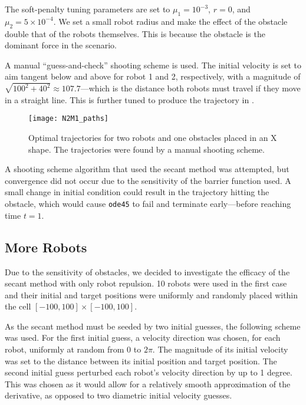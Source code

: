 \documentclass[11pt]{article}
\begin{document}
The soft-penalty tuning parameters are set to \(\mu_1 = 10^{-3}\), \(r = 0\), and \(\mu_2 = 5 \times 10^{-4}\). We set a small robot radius and make the effect of the obstacle double that of the robots themselves. This is because the obstacle is the dominant force in the scenario.

A manual ``guess-and-check'' shooting scheme is used. The initial velocity is set to aim tangent below and above for robot 1 and 2, respectively, with a magnitude of \(\sqrt{100^2 + 40^2} \approx 107.7\)---which is the distance both robots must travel if they move in a straight line. This is further tuned to produce the trajectory in .

\begin{figure}
	\centering
	\texttt{[image: N2M1\_paths]}
	\caption{Optimal trajectories for two robots and one obstacles placed in an X shape. The trajectories were found by a manual shooting scheme.}
	\label{fig:n2m1-paths}
\end{figure}

A shooting scheme algorithm that used the secant method was attempted, but convergence did not occur due to the sensitivity of the barrier function used. A small change in initial condition could result in the trajectory hitting the obstacle, which would cause \texttt{ode45} to fail and terminate early---before reaching time \(t = 1\).

\subsection{More Robots}

Due to the sensitivity of obstacles, we decided to investigate the efficacy of the secant method with only robot repulsion. 10 robots were used in the first case and their initial and target positions were uniformly and randomly placed within the cell \([-100,100] \times [-100,100]\).

As the secant method must be seeded by two initial guesses, the following scheme was used. For the first initial guess, a velocity direction was chosen, for each robot, uniformly at random from \(0\) to \(2\pi\). The magnitude of its initial velocity was set to the distance between its initial position and target position. The second initial guess perturbed each robot's velocity direction by up to 1 degree. This was chosen as it would allow for a relatively smooth approximation of the derivative, as opposed to two diametric initial velocity guesses.
\end{document}
